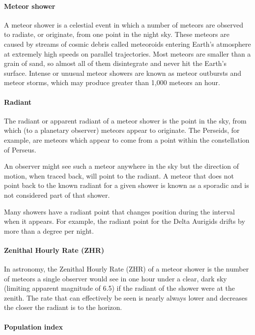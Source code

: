 \paragraph{Meteor shower}
A meteor shower is a celestial event in which a number of meteors are observed to radiate, or originate, from one point in the night sky. These meteors are caused by streams of cosmic debris called meteoroids entering Earth's atmosphere at extremely high speeds on parallel trajectories. Most meteors are smaller than a grain of sand, so almost all of them disintegrate and never hit the Earth's surface. Intense or unusual meteor showers are known as meteor outbursts and meteor storms, which may produce greater than 1,000 meteors an hour.

\paragraph{Radiant}

The radiant or apparent radiant of a meteor shower is the point in the sky, from which (to a planetary observer) meteors appear to originate. The Perseids, for example, are meteors which appear to come from a point within the constellation of Perseus.

An observer might see such a meteor anywhere in the sky but the direction of motion, when traced back, will point to the radiant. A meteor that does not point back to the known radiant for a given shower is known as a sporadic and is not considered part of that shower.

Many showers have a radiant point that changes position during the interval when it appears. For example, the radiant point for the Delta Aurigids drifts by more than a degree per night.

\paragraph{Zenithal Hourly Rate (ZHR)}

In astronomy, the Zenithal Hourly Rate (ZHR) of a meteor shower is the number of meteors a single observer would see in one hour under a clear, dark sky (limiting apparent magnitude of 6.5) if the radiant of the shower were at the zenith. The rate that can effectively be seen is nearly always lower and decreases the closer the radiant is to the horizon.

\paragraph{Population index}

